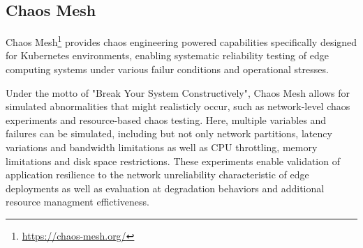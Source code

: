\subsection{Chaos Mesh}
Chaos Mesh\footnote{\url{https://chaos-mesh.org/}} provides chaos engineering powered capabilities specifically designed for Kubernetes environments, enabling systematic reliability testing of edge computing systems under various failur conditions and operational stresses.

Under the motto of "Break Your System Constructively", Chaos Mesh allows for simulated abnormalities that might realisticly occur, such as network-level chaos experiments and resource-based chaos testing.
Here, multiple variables and failures can be simulated, including but not only network partitions, latency variations and bandwidth limitations as well as CPU throttling, memory limitations and disk space restrictions.
These experiments enable validation of application resilience to the network unreliability characteristic of edge deployments as well as evaluation at degradation behaviors and additional resource managment effictiveness.
